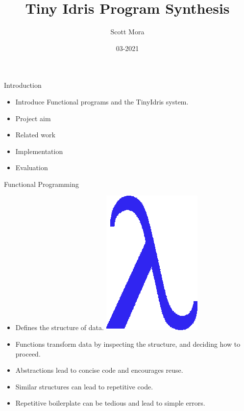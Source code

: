 \documentclass[presentation]{beamer}
\author{Scott Mora}
\date{03-2021}
\title{Tiny Idris Program Synthesis}
\begin{document}
\maketitle

\begin{frame}[fragile]{Introduction}
  \begin{itemize}
  \item Introduce Functional programs and the TinyIdris system.\\
  \item Project aim \\
  \item Related work \\
  \item Implementation \\
  \item Evaluation \\
  \end{itemize}
\end{frame}  

\begin{frame}[fragile]{Functional Programming}
  \begin{itemize}
  \item Defines the structure of data. \hspace{12em}\includegraphics[scale=0.3]{Resource/lam.png}\\
  \item Functions transform data by inspecting the structure, and deciding how to proceed.\\
  \item Abstractions lead to concise code and encourages reuse. \\
  \item Similar structures can lead to repetitive code.\\
  \item Repetitive boilerplate can be tedious and lead to simple errors.\\
  \end{itemize}
\end{frame}  
\end{document}
